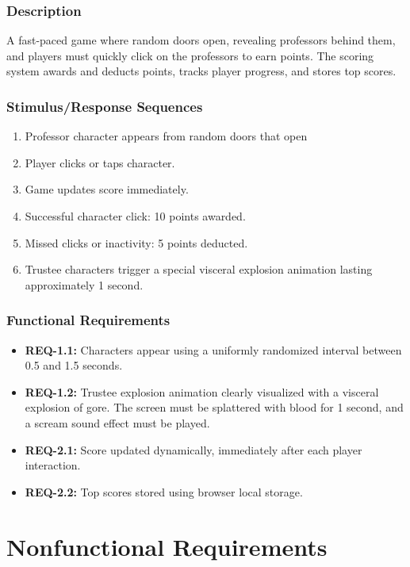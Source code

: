 \documentclass{scrreprt}
\begin{document}
\subsection{Description}
A fast-paced game where random doors open, revealing professors behind them, and players must quickly click on the professors to earn points. The scoring system awards and deducts points, tracks player progress, and stores top scores. 

\subsection{Stimulus/Response Sequences}
\begin{enumerate}
    \item Professor character appears from random doors that open
    \item Player clicks or taps character.
    \item Game updates score immediately.
    \item Successful character click: 10 points awarded.
    \item Missed clicks or inactivity: 5 points deducted.
    \item Trustee characters trigger a special visceral explosion animation lasting approximately 1 second.
\end{enumerate}

\subsection{Functional Requirements}
\begin{itemize}
    \item \textbf{REQ-1.1:} Characters appear using a uniformly randomized interval between 0.5 and 1.5 seconds.
    \item \textbf{REQ-1.2:} Trustee explosion animation clearly visualized with a visceral explosion of gore. The screen must be splattered with blood for 1 second, and a scream sound effect must be played.
    \item \textbf{REQ-2.1:} Score updated dynamically, immediately after each player interaction.
    \item \textbf{REQ-2.2:} Top scores stored using browser local storage.
\end{itemize}

\chapter{Nonfunctional Requirements}
\end{document}
